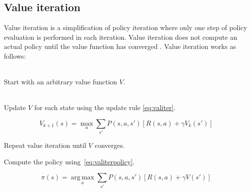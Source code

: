 \subsection{Value iteration}
\label{sec:valueiteration}

Value iteration is a simplification of policy iteration where only one step of
policy evaluation is performed in each iteration. Value iteration does not compute an actual
policy until the value function has converged \parencite{barto1998reinforcement}. Value iteration works as follows:

\begin{description}
\item[Initialization] \hfill \\
    Start with an arbitrary value function $V$.
\item[Value iteration] \hfill \\
    Update $V$ for each state using the update rule \eqref{eq:valiter}.

\begin{equation} \label{eq:valiter}
V_{k+1}(s) = \max_a \sum_{s'}{P(s, a, s') \left[R(s, a) + \gamma V_k(s')\right]}
\end{equation}

\item Repeat value iteration until $V$ converges.
\item Compute the policy using~\eqref{eq:valiterpolicy}.

\begin{equation} \label{eq:valiterpolicy}
\pi(s) = \operatorname*{arg\,max}_a \sum_{s'}{P(s, a, s') \left[R(s, a) + \gamma V(s')\right]}
\end{equation}

\end{description}
